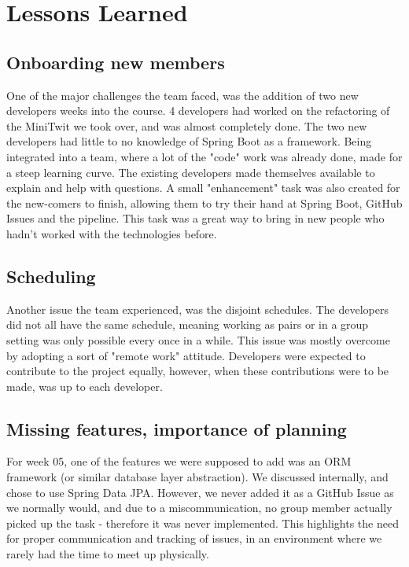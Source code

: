 \section{Lessons Learned}

\subsection{Onboarding new members}
One of the major challenges the team faced, was the addition of two new developers weeks into the course. 4 developers had worked on the refactoring of the MiniTwit we took over, and was almost completely done. The two new developers had little to no knowledge of Spring Boot as a framework. Being integrated into a team, where a lot of the "code" work was already done, made for a steep learning curve. The existing developers made themselves available to explain and help with questions. A small "enhancement" task was also created for the new-comers to finish, allowing them to try their hand at Spring Boot, GitHub Issues and the pipeline. This task was a great way to bring in new people who hadn't worked with the technologies before. 

\subsection{Scheduling}
Another issue the team experienced, was the disjoint schedules. The developers did not all have the same schedule, meaning working as pairs or in a group setting was only possible every once in a while. This issue was mostly overcome by adopting a sort of "remote work" attitude. Developers were expected to contribute to the project equally, however, when these contributions were to be made, was up to each developer.

\subsection{Missing features, importance of planning}
For week 05, one of the features we were supposed to add was an ORM framework (or similar database layer abstraction). We discussed internally, and chose to use Spring Data JPA. However, we never added it as a GitHub Issue as we normally would, and due to a miscommunication, no group member actually picked up the task - therefore it was never implemented. This highlights the need for proper communication and tracking of issues, in an environment where we rarely had the time to meet up physically. 

